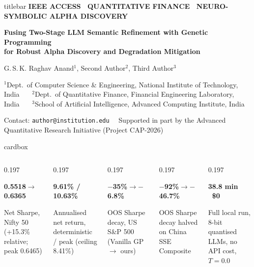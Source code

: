 \documentclass[final]{beamer}
\newcommand{\code}[1]{\texttt{#1}}
\newcommand{\metriccard}[2]{%
  \begin{minipage}[t]{\linewidth}\centering
    {\fontsize{30}{36}\selectfont\bfseries\color{navy2}#1}\par\vskip0.16cm
    {\small #2}
  \end{minipage}%
}
\begin{document}
\begin{frame}[t]{}

\begin{beamercolorbox}[wd=\textwidth,leftskip=0.8cm,rightskip=0.8cm,sep=0.5cm,center]{titlebar}
  {\normalsize\bfseries\color{accent!45!white}
   IEEE ACCESS \textbullet\ QUANTITATIVE FINANCE \textbullet\ NEURO-SYMBOLIC ALPHA DISCOVERY}\par\vskip0.35cm
  {\fontsize{46}{54}\selectfont\bfseries
   Fusing Two-Stage LLM Semantic Refinement with Genetic Programming\\[0.1cm]
   for Robust Alpha Discovery and Degradation Mitigation}\par\vskip0.32cm
  {\large G.\,S.\,K. Raghav Anand$^{1}$, Second Author$^{2}$, Third Author$^{3}$}\par\vskip0.15cm
  {\small $^{1}$Dept.\ of Computer Science \& Engineering, National Institute of Technology, India
   \ \textbullet\ \ $^{2}$Dept.\ of Quantitative Finance, Financial Engineering Laboratory, India
   \ \textbullet\ \ $^{3}$School of Artificial Intelligence, Advanced Computing Institute, India}\par\vskip0.18cm
  {\small Contact: \code{author@institution.edu} \ \textbullet\ Supported in part by the Advanced Quantitative Research Initiative (Project CAP-2026)}
\end{beamercolorbox}

\begin{beamercolorbox}[wd=\textwidth,leftskip=0.8cm,rightskip=0.8cm,sep=0.4cm]{cardbox}
\begin{columns}[t]
  \begin{column}{0.197\textwidth}\metriccard{0.5518$\rightarrow$0.6365}{Net Sharpe, Nifty 50 (+15.3\% relative; peak 0.6465)}\end{column}
  \begin{column}{0.197\textwidth}\metriccard{9.61\% / 10.63\%}{Annualised net return, deterministic / peak (ceiling 8.41\%)}\end{column}
  \begin{column}{0.197\textwidth}\metriccard{$-$35\%$\rightarrow-$6.8\%}{OOS Sharpe decay, US S\&P 500 (Vanilla GP $\rightarrow$ ours)}\end{column}
  \begin{column}{0.197\textwidth}\metriccard{$-$92\%$\rightarrow-$46.7\%}{OOS Sharpe decay halved on China SSE Composite}\end{column}
  \begin{column}{0.197\textwidth}\metriccard{38.8 min \textbullet\ \$0}{Full local run, 8-bit quantised LLMs, no API cost, $T{=}0.0$}\end{column}
\end{columns}
\end{beamercolorbox}


\end{frame}
\end{document}
